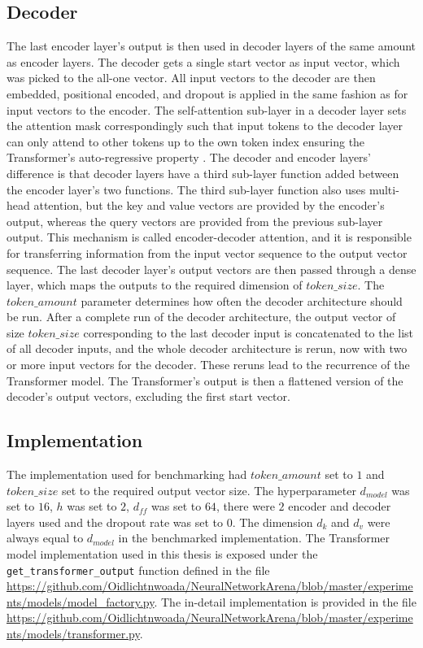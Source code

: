\documentclass[draft,final]{vutinfth} %
\begin{document}
    \subsection{Decoder} \label{decoder}
    The last encoder layer's output is then used in decoder layers of the same amount as encoder layers.
    The decoder gets a single start vector as input vector, which was picked to the all-one vector.
    All input vectors to the decoder are then embedded, positional encoded, and dropout is applied in the same fashion as for input vectors to the encoder.
    The self-attention sub-layer in a decoder layer sets the attention mask correspondingly such that input tokens to the decoder layer can only attend to other tokens up to the own token index ensuring the Transformer's auto-regressive property \cite[p. 5]{Transformer}.
    The decoder and encoder layers' difference is that decoder layers have a third sub-layer function added between the encoder layer's two functions.
    The third sub-layer function also uses multi-head attention, but the key and value vectors are provided by the encoder's output, whereas the query vectors are provided from the previous sub-layer output.
    This mechanism is called encoder-decoder attention, and it is responsible for transferring information from the input vector sequence to the output vector sequence.
    The last decoder layer's output vectors are then passed through a dense layer, which maps the outputs to the required dimension of $token\_size$.
    The $token\_amount$ parameter determines how often the decoder architecture should be run.
    After a complete run of the decoder architecture, the output vector of size $token\_size$ corresponding to the last decoder input is concatenated to the list of all decoder inputs, and the whole decoder architecture is rerun, now with two or more input vectors for the decoder.
    These reruns lead to the recurrence of the Transformer model.
    The Transformer's output is then a flattened version of the decoder's output vectors, excluding the first start vector.

    \subsection{Implementation}
    The implementation used for benchmarking had $token\_amount$ set to $1$ and $token\_size$ set to the required output vector size.
    The hyperparameter $d_{model}$ was set to $16$, $h$ was set to $2$, $d_{ff}$ was set to $64$, there were $2$ encoder and decoder layers used and the dropout rate was set to $0$.
    The dimension $d_k$ and $d_v$ were always equal to $d_{model}$ in the benchmarked implementation.
    The Transformer model implementation used in this thesis is exposed under the \texttt{get\_transformer\_output} function defined in the file \url{https://github.com/Oidlichtnwoada/NeuralNetworkArena/blob/master/experiments/models/model_factory.py}.
    The in-detail implementation is provided in the file \url{https://github.com/Oidlichtnwoada/NeuralNetworkArena/blob/master/experiments/models/transformer.py}.
\end{document}
